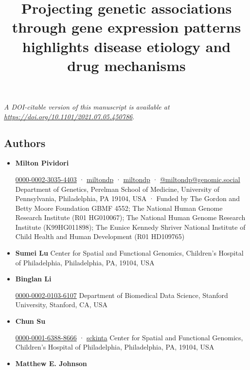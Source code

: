 \documentclass[
  legalpaperpaper,
]{article}
\title{Projecting genetic associations through gene expression patterns highlights disease etiology and drug mechanisms}
\author{}
\date{}
\begin{document}
\maketitle

\emph{A DOI-citable version of this manuscript is available at \url{https://doi.org/10.1101/2021.07.05.450786}}.

\hypertarget{authors}{%
\subsection{Authors}\label{authors}}

\begin{itemize}
\item
  \textbf{Milton Pividori}
  
  \href{https://orcid.org/0000-0002-3035-4403}{0000-0002-3035-4403}
  · 
  \href{https://github.com/miltondp}{miltondp}
  · 
  \href{https://twitter.com/miltondp}{miltondp}
  · 
  \href{https://genomic.social/@miltondp}{@miltondp@genomic.social}
  Department of Genetics, Perelman School of Medicine, University of Pennsylvania, Philadelphia, PA 19104, USA
  · Funded by The Gordon and Betty Moore Foundation GBMF 4552; The National Human Genome Research Institute (R01 HG010067); The National Human Genome Research Institute (K99HG011898); The Eunice Kennedy Shriver National Institute of Child Health and Human Development (R01 HD109765)
\item
  \textbf{Sumei Lu}
  Center for Spatial and Functional Genomics, Children's Hospital of Philadelphia, Philadelphia, PA, 19104, USA
\item
  \textbf{Binglan Li}
  
  \href{https://orcid.org/0000-0002-0103-6107}{0000-0002-0103-6107}
  Department of Biomedical Data Science, Stanford University, Stanford, CA, USA
\item
  \textbf{Chun Su}
  
  \href{https://orcid.org/0000-0001-6388-8666}{0000-0001-6388-8666}
  · 
  \href{https://github.com/sckinta}{sckinta}
  Center for Spatial and Functional Genomics, Children's Hospital of Philadelphia, Philadelphia, PA, 19104, USA
\item
  \textbf{Matthew E. Johnson}

\end{itemize}
\end{document}
